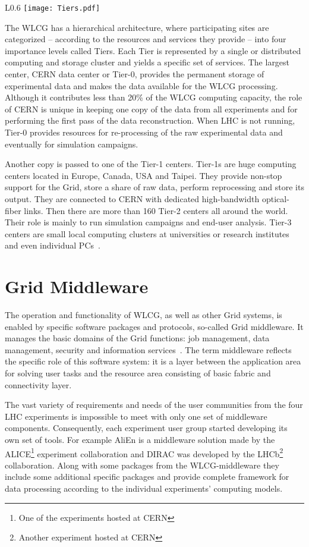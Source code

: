 \begin{wrapfigure}{L}{0.6\textwidth}
\centering
\texttt{[image: Tiers.pdf]}
\caption{The WLCG Tier-1 centers with CERN Tier-0 in the middle}
\label{fig:WLCG}
\end{wrapfigure}

The WLCG has a hierarchical architecture, where participating sites are categorized -- according to the resources 
and services they provide -- into four importance levels called Tiers. Each Tier is represented by a single or 
distributed computing and storage cluster and yields a specific set of services. The largest center, CERN data 
center or Tier-0, provides the  permanent storage of experimental data and makes the data available for the WLCG 
processing. Although it contributes less than 20\% of the WLCG computing capacity, the role of CERN is unique in 
keeping one copy of the data from all experiments and for performing the first pass of the data reconstruction. 
When LHC is not running, Tier-0 provides resources for re-processing of the raw experimental data and eventually 
for simulation campaigns. 

Another copy is passed to one of the Tier-1 centers. Tier-1s are huge computing centers located in Europe, Canada, USA 
and Taipei. They provide non-stop support for the Grid, store a share of raw data, perform reprocessing and store 
its output. They are connected to CERN with dedicated high-bandwidth optical-fiber links. Then there are more than 
160 Tier-2 centers all around the world. Their role is mainly to run simulation campaigns and end-user analysis. 
Tier-3 centers are small local computing clusters at universities or research institutes and even individual 
PCs~\cite{TGrid}.

\section*{Grid Middleware}

The operation and functionality of WLCG, as well as other Grid systems, is enabled by specific software packages 
and protocols, so-called Grid middleware. It manages the basic domains of the Grid functions: job management, 
data management, security and information services~\cite{GriCom}. The term middleware reflects the specific role 
of this software system: it is a layer between the application area for solving user tasks 
and the resource area consisting of basic fabric and connectivity layer. 

The vast variety of requirements and needs of the user communities from the four LHC experiments is impossible to 
meet with only one set of middleware components. Consequently, each experiment user group started developing its 
own set of tools. For example AliEn is a middleware solution made by the 
ALICE\footnote{One of the experiments hosted at CERN} experiment collaboration and DIRAC was developed by the 
LHCb\footnote{Another experiment hosted at CERN} collaboration. Along with some packages from the WLCG-middleware 
they include some additional specific packages and provide complete framework for data processing according to the 
individual experiments' computing models.

